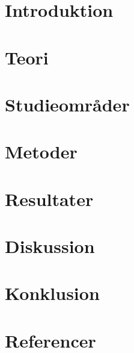 \documentclass[12pt]{article}
\begin{document}
\newpage

\tableofcontents
\newpage


\section{Introduktion}



\section{Teori}







\section{Studieområder}


\newpage
\section{Metoder}







\newpage
\section{Resultater}


\section{Diskussion}


\newpage
\section{Konklusion}


\newpage
\section{Referencer}
{\fontsize{11}{13} \selectfont }
\end{document}
